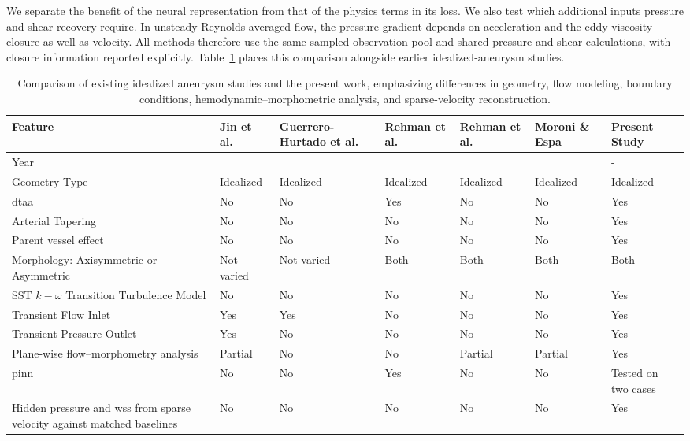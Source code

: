 \documentclass[12pt,a4paper]{article}
\newcommand{\DTAA}{\ac{dtaa}\xspace}
\newcommand{\WSS}{\ac{wss}\xspace}
\newcommand{\PINNcap}{\Ac{pinn}\xspace}
\theoremstyle{definition}
\numberwithin{equation}{section}
\begin{document}
We separate the benefit of the neural representation from that of the physics terms in its loss. We also test which additional inputs pressure and shear recovery require. In unsteady Reynolds-averaged flow, the pressure gradient depends on acceleration and the eddy-viscosity closure as well as velocity. All methods therefore use the same sampled observation pool and shared pressure and shear calculations, with closure information reported explicitly. Table~\ref{tab:lit_review} places this comparison alongside earlier idealized-aneurysm studies.


\begin{table}[htbp]
\centering
\footnotesize
\caption{Comparison of existing idealized aneurysm studies and the present work, emphasizing differences in geometry, flow modeling, boundary conditions, hemodynamic--morphometric analysis, and sparse-velocity reconstruction.}
\setlength{\tabcolsep}{3pt}
\begin{tabular}{|>{\raggedright\arraybackslash}p{4.0cm}|*{6}{>{\centering\arraybackslash}p{1.78cm}|}}
\hline
\textbf{Feature} & \parbox{1.78cm}{\textbf{Jin et al.~\cite{jin2021arterial}}} & \parbox{1.78cm}{\textbf{Guerrero-Hurtado et al.~\cite{guerrero2023efficient}}} & \parbox{1.78cm}{\textbf{Rehman et al.~\cite{rehman2024comparative}}} & \parbox{1.78cm}{\textbf{Rehman et al.~\cite{rehman2025application}}} & \parbox{1.78cm}{\textbf{Moroni \& Espa~\cite{moroni2025insight}}} & \parbox{1.78cm}{\textbf{Present Study}} \\
\hline
Year & 2021 & 2023 & 2024 & 2025 & 2025 & - \\
\hline
Geometry Type & Idealized & Idealized & Idealized & Idealized & Idealized & Idealized \\
\hline
\DTAA & No & No & Yes & No & No & Yes \\
\hline
{Arterial Tapering} & No & No & No & No & No & Yes \\
\hline
Parent vessel effect & No & No & No & No & No & Yes \\
\hline
\parbox{3.7cm}{Morphology: Axisymmetric or Asymmetric} & Not varied & Not varied & Both & Both & Both & Both \\
\hline
\parbox{3.7cm}{SST $k-\omega$ Transition Turbulence Model} & No & No & No & No & No & Yes \\
\hline
Transient Flow Inlet & Yes & Yes & No & No & No & Yes \\
\hline
\parbox{3cm}{Transient Pressure Outlet} & Yes & No & No & No & No & Yes \\
\hline
Plane-wise flow--morphometry analysis & Partial & No & No & Partial & Partial & Yes \\
\hline
\PINNcap & No & No & Yes & No & No & Tested on two cases \\
\hline
Hidden pressure and \WSS from sparse velocity against matched baselines & No & No & No & No & No & Yes \\
\hline
\end{tabular}%
\label{tab:lit_review}
\end{table}
\end{document}
